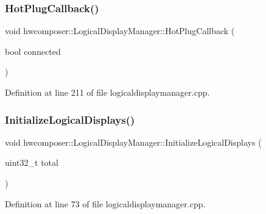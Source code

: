 \subsubsection{\texorpdfstring{Hot\+Plug\+Callback()}{HotPlugCallback()}}
{\footnotesize\ttfamily void hwcomposer\+::\+Logical\+Display\+Manager\+::\+Hot\+Plug\+Callback (\begin{DoxyParamCaption}\item[{bool}]{connected }\end{DoxyParamCaption})}



Definition at line 211 of file logicaldisplaymanager.\+cpp.


\begin{DoxyCode}{0}
\end{DoxyCode}
\mbox{\label{classhwcomposer_1_1LogicalDisplayManager_a009d47157fe5b3290d9cbe3faa3414b0}} 
\subsubsection{\texorpdfstring{Initialize\+Logical\+Displays()}{InitializeLogicalDisplays()}}
{\footnotesize\ttfamily void hwcomposer\+::\+Logical\+Display\+Manager\+::\+Initialize\+Logical\+Displays (\begin{DoxyParamCaption}\item[{uint32\+\_\+t}]{total }\end{DoxyParamCaption})}



Definition at line 73 of file logicaldisplaymanager.\+cpp.


